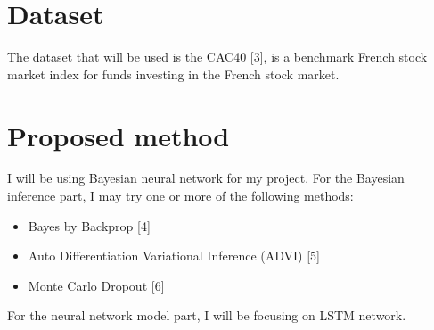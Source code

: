 \documentclass[12pt]{amsart}
\begin{document}
{{\begin{enumerate}
\end{enumerate}



\vfill
\pagebreak 
\section{Dataset}
The dataset that will be used is the CAC40 [3], is a benchmark French stock market index for funds investing in the French stock market. 
\bigskip
\section{Proposed method}

I will be using Bayesian neural network for my project. For the Bayesian inference part, I may try one or more of the following methods: \\

\begin{itemize} 
\item Bayes by Backprop [4] 
\item Auto Differentiation Variational Inference (ADVI) [5] 
\item Monte Carlo Dropout [6] \\
\end{itemize}

For the neural network model part, I will be focusing on LSTM network. \\




}}
\end{document}
